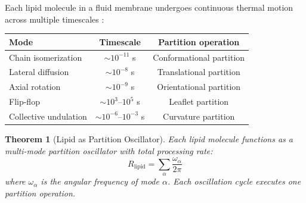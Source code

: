 \documentclass[twocolumn,10pt]{article}
\newtheorem{theorem}{Theorem}[section]
\theoremstyle{remark}
\begin{document}
Each lipid molecule in a fluid membrane undergoes continuous thermal motion across multiple timescales \cite{lindahl2008,baoukina2010}:

\begin{center}
\begin{tabular}{lcc}
\toprule
Mode & Timescale & Partition operation \\
\midrule
Chain isomerization & $\sim 10^{-11}$ s & Conformational partition \\
Lateral diffusion & $\sim 10^{-8}$ s & Translational partition \\
Axial rotation & $\sim 10^{-9}$ s & Orientational partition \\
Flip-flop & $\sim 10^{3}$--$10^{5}$ s & Leaflet partition \\
Collective undulation & $\sim 10^{-6}$--$10^{-3}$ s & Curvature partition \\
\bottomrule
\end{tabular}
\end{center}

\begin{theorem}[Lipid as Partition Oscillator]
\label{thm:lipid_oscillator}
Each lipid molecule functions as a multi-mode partition oscillator with total processing rate:
\begin{equation}
    R_{\text{lipid}} = \sum_{\alpha} \frac{\omega_\alpha}{2\pi}
\end{equation}
where $\omega_\alpha$ is the angular frequency of mode $\alpha$. Each oscillation cycle executes one partition operation.
\end{theorem}
\end{document}
